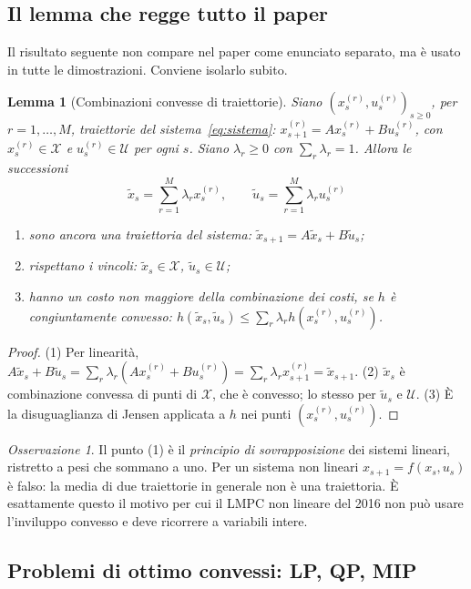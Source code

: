 \documentclass[11pt,a4paper]{article}
\theoremstyle{definition}
\theoremstyle{plain}
\newtheorem{lemma}[definizione]{Lemma}
\theoremstyle{remark}
\newtheorem{osservazione}[definizione]{Osservazione}
\newcommand{\Xc}{\mathcal{X}}
\newcommand{\Uc}{\mathcal{U}}
\begin{document}
\subsection{Il lemma che regge tutto il paper}\label{sec:lemma-traiettorie}

Il risultato seguente non compare nel paper come enunciato separato, ma è
usato in tutte le dimostrazioni. Conviene isolarlo subito.

\begin{lemma}[Combinazioni convesse di traiettorie]\label{lem:traiettorie}
Siano $(x^{(r)}_s, u^{(r)}_s)_{s\ge 0}$, per $r=1,\dots,M$, traiettorie del
sistema~\eqref{eq:sistema}: $x^{(r)}_{s+1} = A x^{(r)}_s + B u^{(r)}_s$, con
$x^{(r)}_s\in\Xc$ e $u^{(r)}_s\in\Uc$ per ogni $s$. Siano $\lambda_r\ge 0$ con
$\sum_r\lambda_r=1$. Allora le successioni
\[
  \tilde x_s = \sum_{r=1}^M\lambda_r x^{(r)}_s, \qquad
  \tilde u_s = \sum_{r=1}^M\lambda_r u^{(r)}_s
\]
\begin{enumerate}
  \item sono ancora una traiettoria del sistema: $\tilde x_{s+1}=A\tilde x_s+B\tilde u_s$;
  \item rispettano i vincoli: $\tilde x_s\in\Xc$, $\tilde u_s\in\Uc$;
  \item hanno un costo non maggiore della combinazione dei costi, se $h$ è
        congiuntamente convesso:
        $h(\tilde x_s,\tilde u_s)\le\sum_r\lambda_r h(x^{(r)}_s,u^{(r)}_s)$.
\end{enumerate}
\end{lemma}
\begin{proof}
(1) Per linearità,
$A\tilde x_s + B\tilde u_s = \sum_r\lambda_r(Ax^{(r)}_s+Bu^{(r)}_s)
=\sum_r\lambda_r x^{(r)}_{s+1}=\tilde x_{s+1}$.
(2) $\tilde x_s$ è combinazione convessa di punti di $\Xc$, che è convesso;
lo stesso per $\tilde u_s$ e $\Uc$.
(3) È la disuguaglianza di Jensen applicata a $h$ nei punti
$(x^{(r)}_s,u^{(r)}_s)$.
\end{proof}

\begin{osservazione}
Il punto (1) è il \emph{principio di sovrapposizione} dei sistemi lineari,
ristretto a pesi che sommano a uno. Per un sistema non lineari
$x_{s+1}=f(x_s,u_s)$ è falso: la media di due traiettorie in generale non è
una traiettoria. È esattamente questo il motivo per cui il LMPC non lineare
del 2016 non può usare l'inviluppo convesso e deve ricorrere a variabili
intere.
\end{osservazione}

\subsection{Problemi di ottimo convessi: LP, QP, MIP}\label{sec:ottimizzazione}
\end{document}
